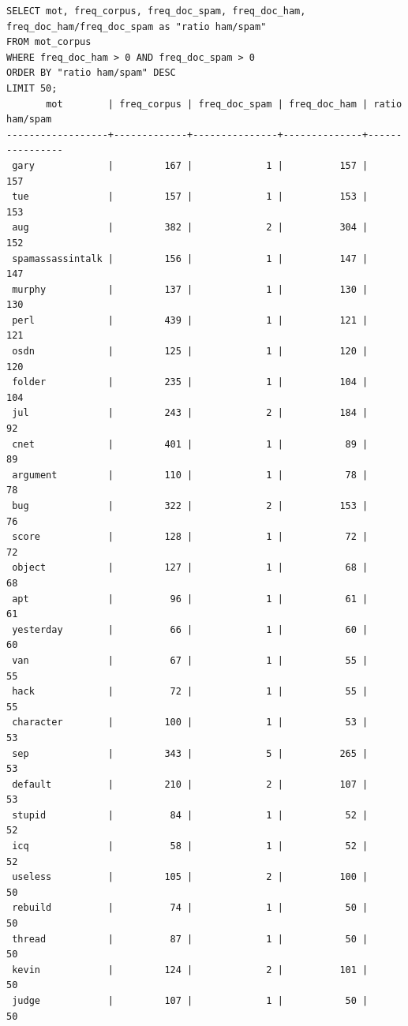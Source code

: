 \documentclass[a4paper,12pt]{article}
\begin{document}
	\begin{verbatim}
SELECT mot, freq_corpus, freq_doc_spam, freq_doc_ham, 
freq_doc_ham/freq_doc_spam as "ratio ham/spam"
FROM mot_corpus
WHERE freq_doc_ham > 0 AND freq_doc_spam > 0
ORDER BY "ratio ham/spam" DESC
LIMIT 50;
       mot        | freq_corpus | freq_doc_spam | freq_doc_ham | ratio ham/spam 
------------------+-------------+---------------+--------------+----------------
 gary             |         167 |             1 |          157 |            157
 tue              |         157 |             1 |          153 |            153
 aug              |         382 |             2 |          304 |            152
 spamassassintalk |         156 |             1 |          147 |            147
 murphy           |         137 |             1 |          130 |            130
 perl             |         439 |             1 |          121 |            121
 osdn             |         125 |             1 |          120 |            120
 folder           |         235 |             1 |          104 |            104
 jul              |         243 |             2 |          184 |             92
 cnet             |         401 |             1 |           89 |             89
 argument         |         110 |             1 |           78 |             78
 bug              |         322 |             2 |          153 |             76
 score            |         128 |             1 |           72 |             72
 object           |         127 |             1 |           68 |             68
 apt              |          96 |             1 |           61 |             61
 yesterday        |          66 |             1 |           60 |             60
 van              |          67 |             1 |           55 |             55
 hack             |          72 |             1 |           55 |             55
 character        |         100 |             1 |           53 |             53
 sep              |         343 |             5 |          265 |             53
 default          |         210 |             2 |          107 |             53
 stupid           |          84 |             1 |           52 |             52
 icq              |          58 |             1 |           52 |             52
 useless          |         105 |             2 |          100 |             50
 rebuild          |          74 |             1 |           50 |             50
 thread           |          87 |             1 |           50 |             50
 kevin            |         124 |             2 |          101 |             50
 judge            |         107 |             1 |           50 |             50

\end{verbatim}
\end{document}
